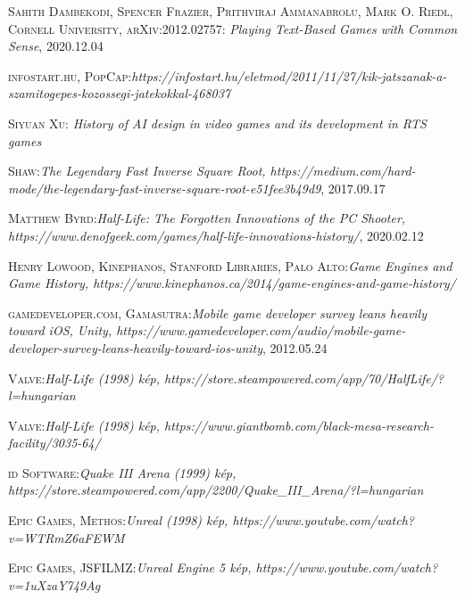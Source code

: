 \documentclass[]{thesis-ekf}
\theoremstyle{definition}
\begin{document}
	\begin{thebibliography}{2}
		\textsc{Sahith Dambekodi, Spencer Frazier, Prithviraj Ammanabrolu, Mark O. Riedl, Cornell University, arXiv:2012.02757}: \emph{Playing Text-Based Games with Common Sense}, 2020.12.04
		
		\textsc{infostart.hu, PopCap}:\emph{https://infostart.hu/eletmod/2011/11/27/kik-jatszanak-a-szamitogepes-kozossegi-jatekokkal-468037}
		
		\textsc{Siyuan Xu}:\emph{ History of AI design in video games and its development in RTS games }
		
		\textsc{Shaw}:\emph{The Legendary Fast Inverse Square Root, https://medium.com/hard-mode/the-legendary-fast-inverse-square-root-e51fee3b49d9}, 2017.09.17
		
		\textsc{Matthew Byrd}:\emph{Half-Life: The Forgotten Innovations of the PC Shooter, https://www.denofgeek.com/games/half-life-innovations-history/}, 2020.02.12
		
		\textsc{Henry Lowood, Kinephanos, Stanford Libraries, Palo Alto}:\emph{Game Engines and Game History, https://www.kinephanos.ca/2014/game-engines-and-game-history/}
		
		\textsc{gamedeveloper.com, Gamasutra}:\emph{Mobile game developer survey leans heavily toward iOS, Unity, https://www.gamedeveloper.com/audio/mobile-game-developer-survey-leans-heavily-toward-ios-unity}, 2012.05.24
		
		\textsc{Valve}:\emph{Half-Life (1998) kép, https://store.steampowered.com/app/70/HalfLife/?l=hungarian}
		
		\textsc{Valve}:\emph{Half-Life (1998) kép, https://www.giantbomb.com/black-mesa-research-facility/3035-64/}
		
		\textsc{id Software}:\emph{Quake III Arena (1999) kép, https://store.steampowered.com/app/2200/Quake\_III\_Arena/?l=hungarian}
		
		\textsc{Epic Games, Methos}:\emph{Unreal (1998) kép, https://www.youtube.com/watch?v=WTRmZ6aFEWM}
		
		\textsc{Epic Games, JSFILMZ}:\emph{Unreal Engine 5 kép, https://www.youtube.com/watch?v=1uXzaY749Ag}
		

\end{thebibliography}
\end{document}
